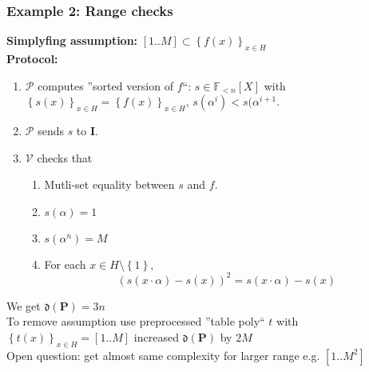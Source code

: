 \documentclass[shadesubsections,compress,14pt,mathserif]{beamer}
\newcommand{\prot}{\mathbf{P}}
\newcommand{\aggdeg}[1]{\mathfrak{d}(#1)}
\newcommand{\F}{\ensuremath{\mathbb F}}
\newcommand{\set}[1]{\ensuremath{\left\{#1\right\}}}
\newcommand{\sett}[2]{\ensuremath{\left\{#1\right\}_{#2}}}
\newcommand{\ver}{\ensuremath{\mathcal{V}}}
\newcommand{\prv}{\ensuremath{\mathcal{P}}}
\newcommand{\polysofdeg}[1]{\F_{< #1}[X]}
\newcommand{\ideal}{\mathbf{I}}
\begin{document}
\begin{frame}
\frametitle{Example 2: Range checks}

\textbf{Simplyfing assumption:} $[1..M]\subset \sett{f(x)}{x\in H}$\\ \pause
\textbf{Protocol:}
 \begin{enumerate}
 \item $\prv$ computes ''sorted version of $f$``: $s\in \polysofdeg{n}$ with
 $\sett{s(x)}{x\in H}=\sett{f(x)}{x\in H}$, $s(\alpha^i)<s(\alpha^{i+1}$.\pause
 \item $\prv$ sends $s$ to $\ideal$.\pause
 \item $\ver$ checks that
 \begin{enumerate}
  \item Mutli-set equality between $s$ and $f$.\pause
  \item $s(\alpha)=1$
  \item $s(\alpha^n) = M$\pause
  \item For each $x\in H\setminus \set{1}$,\pause
  \[ (s(x\cdot \alpha) - s(x))^2 = s(x\cdot \alpha) - s(x)\]
 \end{enumerate}

\end{enumerate}


We get $\aggdeg{\prot}=3n$\pause \\
To remove assumption use preprocessed ''table poly`` $t$ with $\sett{t(x)}{x\in H}=[1..M]$
increased  $\aggdeg{\prot}$ by $2M$\pause \\
Open question: get almost same complexity for larger range e.g. $[1..M^2]$ 



\end{frame}
\end{document}
